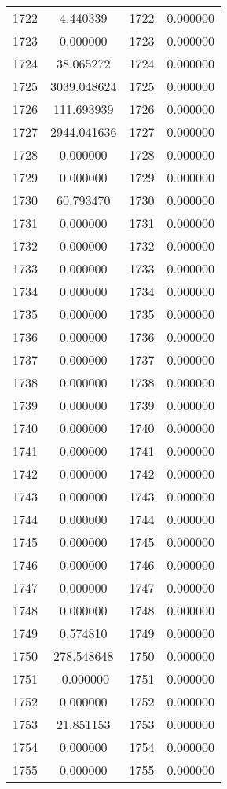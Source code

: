 \documentclass[12pt]{article}
\begin{document}
\begin{longtable}{@{}cccc@{}}
1722 & 4.440339 & 1722 & 0.000000 \\
1723 & 0.000000 & 1723 & 0.000000 \\
1724 & 38.065272 & 1724 & 0.000000 \\
1725 & 3039.048624 & 1725 & 0.000000 \\
1726 & 111.693939 & 1726 & 0.000000 \\
1727 & 2944.041636 & 1727 & 0.000000 \\
1728 & 0.000000 & 1728 & 0.000000 \\
1729 & 0.000000 & 1729 & 0.000000 \\
1730 & 60.793470 & 1730 & 0.000000 \\
1731 & 0.000000 & 1731 & 0.000000 \\
1732 & 0.000000 & 1732 & 0.000000 \\
1733 & 0.000000 & 1733 & 0.000000 \\
1734 & 0.000000 & 1734 & 0.000000 \\
1735 & 0.000000 & 1735 & 0.000000 \\
1736 & 0.000000 & 1736 & 0.000000 \\
1737 & 0.000000 & 1737 & 0.000000 \\
1738 & 0.000000 & 1738 & 0.000000 \\
1739 & 0.000000 & 1739 & 0.000000 \\
1740 & 0.000000 & 1740 & 0.000000 \\
1741 & 0.000000 & 1741 & 0.000000 \\
1742 & 0.000000 & 1742 & 0.000000 \\
1743 & 0.000000 & 1743 & 0.000000 \\
1744 & 0.000000 & 1744 & 0.000000 \\
1745 & 0.000000 & 1745 & 0.000000 \\
1746 & 0.000000 & 1746 & 0.000000 \\
1747 & 0.000000 & 1747 & 0.000000 \\
1748 & 0.000000 & 1748 & 0.000000 \\
1749 & 0.574810 & 1749 & 0.000000 \\
1750 & 278.548648 & 1750 & 0.000000 \\
1751 & -0.000000 & 1751 & 0.000000 \\
1752 & 0.000000 & 1752 & 0.000000 \\
1753 & 21.851153 & 1753 & 0.000000 \\
1754 & 0.000000 & 1754 & 0.000000 \\
1755 & 0.000000 & 1755 & 0.000000 \\

\end{longtable}
\end{document}
